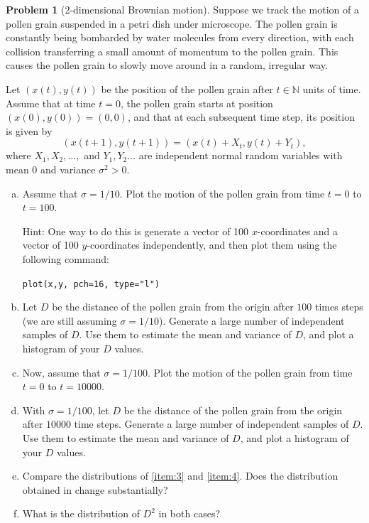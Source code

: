\documentclass[10pt]{article}
\theoremstyle{definition}
\newtheorem{problem}[theorem]{Problem}
\begin{document}
\begin{problem}[2-dimensional Brownian motion]
  Suppose we track the motion of a pollen grain suspended in a petri dish
  under microscope. The pollen grain is constantly being bombarded by water
  molecules from every direction, with each collision transferring a small
  amount of momentum to the pollen grain. This causes the pollen grain to
  slowly move around in a random, irregular way.

  Let $(x(t),y(t))$ be the position of the pollen grain after
  $t\in \mathbb{N}$ units of time. Assume that at time $t=0$, the pollen grain
  starts at position $(x(0),y(0))=(0,0)$, and that at each subsequent time
  step, its position is given by
  \begin{equation*}
    (x(t+1),y(t+1)) = (x(t)+X_{t}, y(t)+Y_{t}),
  \end{equation*}
  where $X_{1},X_{2},\ldots,$ and $Y_{1},Y_{2}\ldots$ are independent normal
  random variables with mean 0 and variance $\sigma^{2}>0$.

  \begin{enumerate}[(a)]
    \item Assume that $\sigma=1/10$. Plot the motion of the pollen grain from
    time $t=0$ to $t=100$.

    Hint: One way to do this is generate a vector of 100 $x$-coordinates and a
    vector of 100 $y$-coordinates independently, and then plot them using the
    following command:
    
    \begin{center}
      \texttt{plot(x,y, pch=16, type="l")}
    \end{center}
    
    \item \label{item:3} Let $D$ be the distance of the pollen grain from the
    origin after $100$ times steps (we are still assuming $\sigma=1/10$).
    Generate a large number of independent samples of $D$. Use them to
    estimate the mean and variance of $D$, and plot a histogram of your $D$
    values.

    \item Now, assume that $\sigma=1/100$. Plot the motion of the pollen grain from
    time $t=0$ to $t=10000$.

    \item \label{item:4} With $\sigma=1/100$, let $D$ be the distance of the
    pollen grain from the origin after $10000$ time steps. Generate a large
    number of independent samples of $D$. Use them to estimate the mean and
    variance of $D$, and plot a histogram of your $D$ values.
    
    \item Compare the distributions of \ref{item:3} and \ref{item:4}. Does the
    distribution obtained in change substantially?
    
    \item What is the distribution of $D^{2}$ in both cases?
  \end{enumerate}
\end{problem}
\printbibliography
\end{document}
